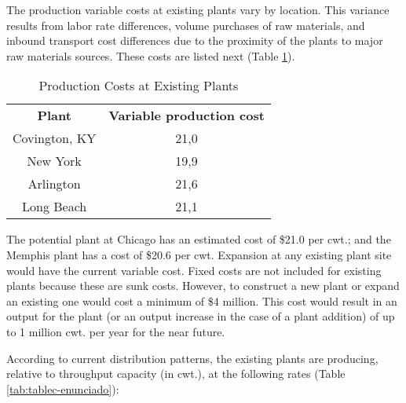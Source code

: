 \documentclass[12pt,a4paper]{article}
\begin{document}
The production variable costs at existing plants vary by location.
This variance results from labor rate differences, volume purchases of raw materials, and inbound transport cost differences due to the proximity of the plants to major raw materials sources.
These costs are listed next (Table \ref{tab:tableb-enunciado}).

\begin{table}[!h]
    \centering
    \caption{Production Costs at Existing Plants}
    \label{tab:tableb-enunciado}
    \begin{tabular}{|c|c|}
    \hline
    \textbf{Plant} & \textbf{Variable production cost} \\
    Covington, KY  & 21,0                              \\
    New York   & 19,9                              \\
    Arlington  & 21,6                              \\
    Long Beach & 21,1                              \\
    \hline
\end{tabular}
\end{table}

The potential plant at Chicago has an estimated cost of \$21.0 per cwt.;
and the Memphis plant has a cost of \$20.6 per cwt.
Expansion at any existing plant site would have the current variable cost.
Fixed costs are not included for existing plants because these are sunk costs.
However, to construct a new plant or expand an existing one would cost a minimum of \$4 million.
This cost would result in an output for the plant (or an output increase in the case of a plant addition) of up to 1 million cwt. per year for the near future.

According to current distribution patterns, the existing plants are producing, relative to throughput capacity (in cwt.), at the following rates (Table \ref{tab:tablec-enunciado}):
\end{document}

